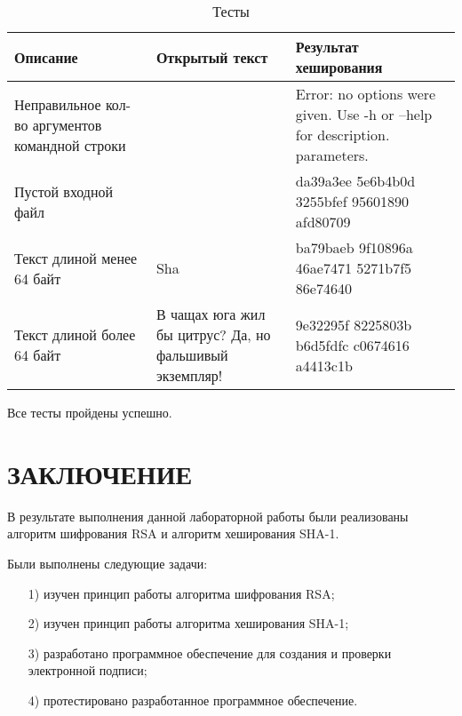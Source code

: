 \documentclass{bmstu}
\begin{document}
\begin{table}[H]
\caption{Тесты}
\label{tabular:tests}
\begin{tabular}{|p{4cm}|p{5cm}|p{6cm}|}
\hline
\textbf{Описание} & \textbf{Открытый текст} & \textbf{Результат хеширования}
\tabularnewline
\hline
Неправильное кол-во аргументов командной строки & & Error: no options were given. 
Use -h or --help for description. parameters.
\tabularnewline
\hline
Пустой входной файл & & da39a3ee 5e6b4b0d 3255bfef 95601890 afd80709
\tabularnewline
\hline
Текст длиной менее 64 байт & Sha & ba79baeb 9f10896a 46ae7471 5271b7f5 86e74640
\tabularnewline
\hline
Текст длиной более 64 байт & В чащах юга жил бы цитрус? Да, но фальшивый экземпляр! & 9e32295f 8225803b b6d5fdfc c0674616 a4413c1b
\tabularnewline
\hline
\end{tabular}
\end{table}
 
Все тесты пройдены успешно.

{\centering \chapter*{ЗАКЛЮЧЕНИЕ}}

В результате выполнения данной лабораторной работы были реализованы алгоритм шифрования RSA и алгоритм хеширования SHA-1.

Были выполнены следующие задачи:
\begin{enumerate}
\item[1)] изучен принцип работы алгоритма шифрования RSA;
\item[2)] изучен принцип работы алгоритма хеширования SHA-1;
\item[3)] разработано программное обеспечение для создания и проверки электронной подписи;
\item[4)] протестировано разработанное программное обеспечение.
\end{enumerate}

{\centering \printbibliography[title=СПИСОК ИСПОЛЬЗОВАННЫХ ИСТОЧНИКОВ,heading=bibintoc]}
\end{document}
